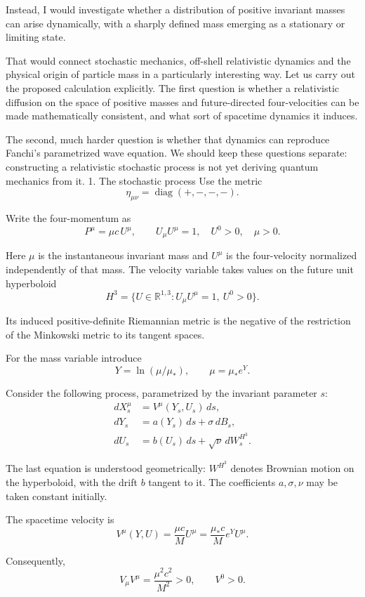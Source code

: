 Instead, I would investigate whether a distribution of positive invariant masses can arise dynamically, with a sharply defined mass emerging as a stationary or limiting state.

That would connect stochastic mechanics, off-shell relativistic dynamics and the physical origin of particle mass in a particularly interesting way.
Let us carry out the proposed calculation explicitly. The first question is whether a relativistic diffusion on the space of positive masses and future-directed four-velocities can be made mathematically consistent, and what sort of spacetime dynamics it induces.

The second, much harder question is whether that dynamics can reproduce Fanchi's parametrized wave equation. We should keep these questions separate: constructing a relativistic stochastic process is not yet deriving quantum mechanics from it.
1. The stochastic process
Use the metric
\[
\eta_{\mu\nu}=\operatorname{diag}(+,-,-,-).
\]

Write the four-momentum as
\[
P^\mu=\mu c\,U^\mu,
\qquad
U_\mu U^\mu=1,\quad U^0>0,\quad \mu>0.
\]

Here \(\mu\) is the instantaneous invariant mass and \(U^\mu\) is the four-velocity normalized independently of that mass. The velocity variable takes values on the future unit hyperboloid
\[
H^3=\{U\in\mathbb R^{1,3}:U_\mu U^\mu=1,\ U^0>0\}.
\]

Its induced positive-definite Riemannian metric is the negative of the restriction of the Minkowski metric to its tangent spaces.

For the mass variable introduce
\[
Y=\ln(\mu/\mu_*),\qquad \mu=\mu_*e^Y.
\]

Consider the following process, parametrized by the invariant parameter \(s\):
\[
\begin{aligned}
dX^\mu_s&=V^\mu(Y_s,U_s)\,ds,\\
dY_s&=a(Y_s)\,ds+\sigma\,dB_s,\\
dU_s&=b(U_s)\,ds+\sqrt{\nu}\,dW_s^{H^3}.
\end{aligned}
\tag{1}
\]

The last equation is understood geometrically: \(W^{H^3}\) denotes Brownian motion on the hyperboloid, with the drift \(b\) tangent to it. The coefficients \(a,\sigma,\nu\) may be taken constant initially.

The spacetime velocity is
\[
V^\mu(Y,U)=\frac{\mu c}{M}U^\mu
=\frac{\mu_*c}{M}e^YU^\mu.
\tag{2}
\]

Consequently,
\[
V_\mu V^\mu=\frac{\mu^2c^2}{M^2}>0,\qquad V^0>0.
\tag{3}
\]

